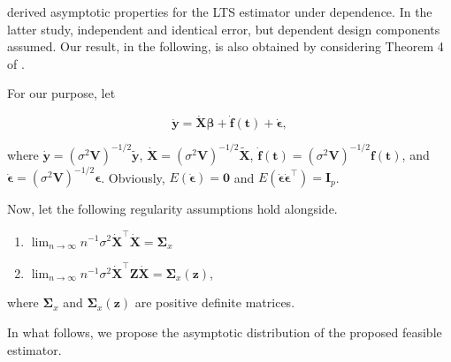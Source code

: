 \documentclass[10pt,twoside]{article}
\numberwithin{equation}{section}
\begin{document}
\cite{cizek2005} derived asymptotic properties for the LTS estimator under {dependence}. In the latter study, independent and identical error, but {dependent} design components assumed. Our result, in the following, is also obtained by considering Theorem 4 of \cite{cizek2005}.



For our purpose, let

\begin{equation*}

\dot{\boldsymbol{y}}=\dot{\boldsymbol{X}}\boldsymbol\beta+\dot{\boldsymbol{f}}(\boldsymbol t)+\dot{\boldsymbol{\epsilon}},

\end{equation*}

where $\dot{\boldsymbol{y}}=(\sigma^2\boldsymbol V)^{-1/2}\widetilde{\boldsymbol y}$, $\dot{\boldsymbol X}=(\sigma^2\boldsymbol V)^{-1/2}\widetilde{\boldsymbol X}$, $\dot{\boldsymbol{f}}(\boldsymbol t)=(\sigma^2\boldsymbol V)^{-1/2}\boldsymbol{f}(\boldsymbol t)$, and $\dot{\boldsymbol{\epsilon}}=(\sigma^2\boldsymbol V)^{-1/2}\boldsymbol{\epsilon}$. Obviously, $E(\dot{\boldsymbol{\epsilon}})=\boldsymbol0$ and $E(\dot{\boldsymbol{\epsilon}}\dot{\boldsymbol{\epsilon}}^\top)=\boldsymbol I_p$.



Now, let the following regularity assumptions hold alongside.

\begin{enumerate}

\item[(A1)] $\lim_{n\to\infty}n^{-1}\sigma^2{\dot{\boldsymbol X}}^\top\dot{\boldsymbol X}=\boldsymbol{\Sigma}_x$

\item[(A2)] $\lim_{n\to\infty}n^{-1}\sigma^2{\dot{\boldsymbol X}}^\top\boldsymbol Z\dot{\boldsymbol X}=\boldsymbol{\Sigma}_x(\boldsymbol z)$,

\end{enumerate}

where $\boldsymbol{\Sigma}_x$ and $\boldsymbol{\Sigma}_x(\boldsymbol z)$ are positive definite matrices.



In what follows, we propose the asymptotic distribution of the proposed feasible estimator.
\end{document}
